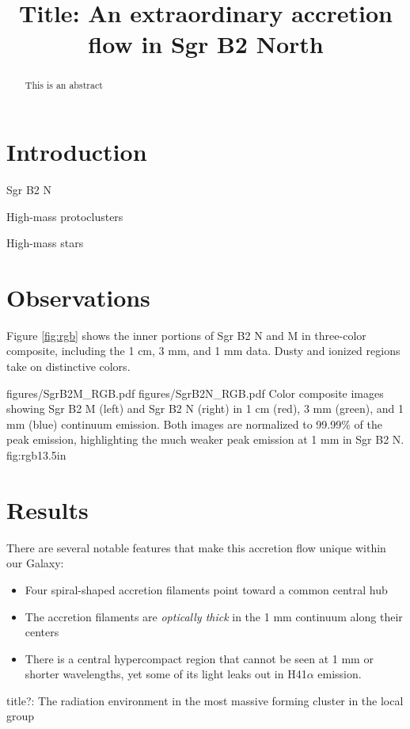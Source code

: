 \documentclass[twocolumn]{aastex61}
\begin{document}
\title{Title: An extraordinary accretion flow in Sgr B2 North}

\begin{abstract}
    This is an abstract
\end{abstract}



\section{Introduction}

Sgr B2 N

High-mass protoclusters

High-mass stars


\section{Observations}


Figure \ref{fig:rgb} shows the inner portions of Sgr B2 N and M in three-color
composite, including the 1 cm, 3 mm, and 1 mm data.  Dusty and ionized regions
take on distinctive colors.

\FigureTwo
{figures/SgrB2M_RGB.pdf}
{figures/SgrB2N_RGB.pdf}
{Color composite images showing Sgr B2 M (left) and Sgr B2 N (right) in 1 cm (red),
3 mm (green), and 1 mm (blue) continuum emission.  Both images are normalized to 99.99\%
of the peak emission, highlighting the much weaker peak emission at 1 mm in Sgr B2 N.}
{fig:rgb}{1}{3.5in}

\section{Results}

There are several notable features that make this accretion flow unique within our Galaxy:

\begin{itemize}
    \item Four spiral-shaped accretion filaments point toward a common central hub
    \item The accretion filaments are \emph{optically thick} in the 1 mm continuum
        along their centers
    \item There is a central hypercompact \hii region that cannot be seen at 1 mm
        or shorter wavelengths, yet some of its light leaks out in H41$\alpha$ emission.
\end{itemize}


title?: The radiation environment in the most massive forming cluster in the local group
\end{document}
